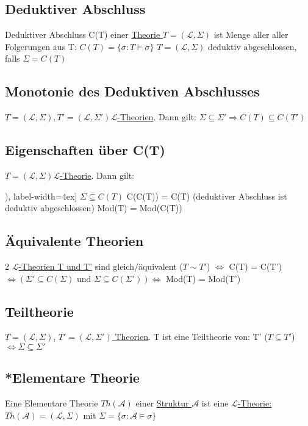 \documentclass[12pt,a4paper]{article} %
\begin{document}
	\subsection{Deduktiver Abschluss}
	Deduktiver Abschluss C(T) einer \hyperref[Theorie]{Theorie $T = (\mathcal{L}, \Sigma)$} ist Menge aller aller Folgerungen aus T: $C(T) = \{\sigma : T \hyperref[Erfullbar]{\vDash} \sigma\}$ \newline
	$T = (\mathcal{L}, \Sigma)$ deduktiv abgeschlossen, falls $\Sigma = C(T)$
	
	\subsection{Monotonie des Deduktiven Abschlusses}
	\hyperref[Theorie]{$T = (\mathcal{L}, \Sigma), T' = (\mathcal{L}, \Sigma') \mathcal{L}$-Theorien}. Dann gilt: $\Sigma \subseteq \Sigma' \Rightarrow C(T) \subseteq C(T')$
	
	\subsection{Eigenschaften über C(T)}
	\hyperref[Theorie]{$T = (\mathcal{L}, \Sigma) \mathcal{L}$-Theorie}. Dann gilt: 
	\begin{tasks}[counter-format=(tsk[r]), label-width=4ex]
		\task $\Sigma \subseteq C(T)$
		\task C(C(T)) = C(T) (deduktiver Abschluss ist deduktiv abgeschlossen)
		\task Mod(T) = Mod(C(T))
	\end{tasks}

	\subsection{Äquivalente Theorien}
	2 \hyperref[Theorie]{$\mathcal{L}$-Theorien T und T'} sind gleich/äquivalent ($T \sim T'$) $\Leftrightarrow$ C(T) = C(T') $\Leftrightarrow (\Sigma' \subseteq C(\Sigma) \text{ und } \Sigma \subseteq C(\Sigma')) \Leftrightarrow$ Mod(T) = Mod(T')
	
	\subsection{Teiltheorie}
	$T = (\mathcal{L}, \Sigma)$, \hyperref[Theorie]{$T' = (\mathcal{L}, \Sigma')$ Theorien}. T ist eine Teiltheorie von: \newline
	T' ($T \subseteq T'$) $\Leftrightarrow \Sigma \subseteq \Sigma'$
	
	\subsection{*Elementare Theorie}
	Eine Elementare Theorie $Th(\mathcal{A})$ einer \hyperref[Struktur]{Struktur $\mathcal{A}$} ist eine \hyperref[Theorie]{$\mathcal{L}$-Theorie: $Th(\mathcal{A}) = (\mathcal{L}, \Sigma)$} mit $\Sigma = \{\sigma : \mathcal{A} \hyperref[Erfullbar]{\vDash} \sigma\}$ 
	
\end{document}
